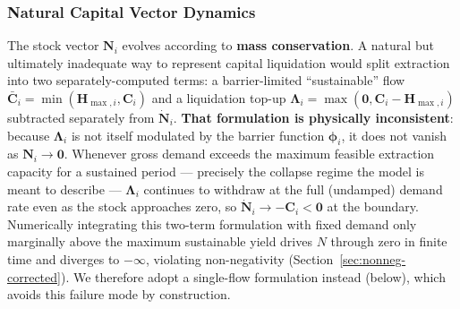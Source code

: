 \documentclass[twocolumn,10pt]{article}
\begin{document}
\subsubsection{Natural Capital Vector Dynamics}
\label{sec:natcap-corrected}
The stock vector \(\mathbf{N}_i\) evolves according to \textbf{mass conservation}. A natural but ultimately inadequate way to represent capital liquidation would split extraction into two separately-computed terms: a barrier-limited ``sustainable'' flow $\bar{\mathbf{C}}_i=\min(\mathbf{H}_{\max,i},\mathbf{C}_i)$ and a liquidation top-up $\boldsymbol{\Lambda}_i=\max(\mathbf{0},\mathbf{C}_i-\mathbf{H}_{\max,i})$ subtracted separately from $\dot{\mathbf N}_i$. \textbf{That formulation is physically inconsistent}: because $\boldsymbol\Lambda_i$ is not itself modulated by the barrier function $\boldsymbol\phi_i$, it does not vanish as $\mathbf N_i\to\mathbf 0$. Whenever gross demand exceeds the maximum feasible extraction capacity for a sustained period — precisely the collapse regime the model is meant to describe — $\boldsymbol\Lambda_i$ continues to withdraw at the full (undamped) demand rate even as the stock approaches zero, so $\dot{\mathbf N}_i\to-\mathbf C_i<\mathbf 0$ at the boundary. Numerically integrating this two-term formulation with fixed demand only marginally above the maximum sustainable yield drives $N$ through zero in finite time and diverges to $-\infty$, violating non-negativity (Section~\ref{sec:nonneg-corrected}). We therefore adopt a single-flow formulation instead (below), which avoids this failure mode by construction.
\end{document}
